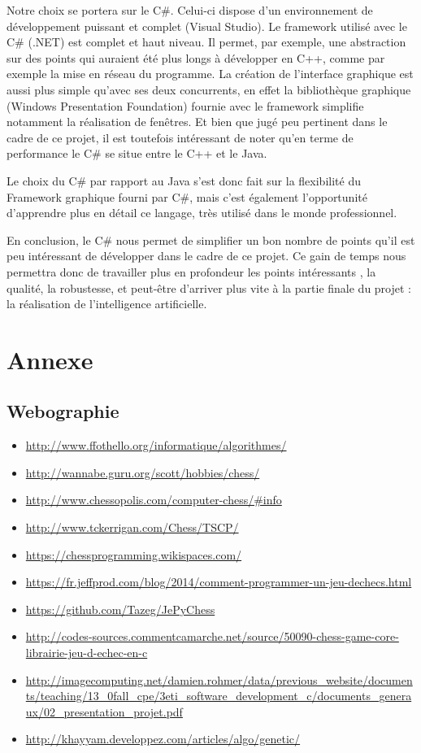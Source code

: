\documentclass{article}
\begin{document}
Notre choix se portera sur le C\#. Celui-ci dispose d'un environnement de développement puissant et complet (Visual Studio). Le framework utilisé avec le C\# (.NET) est complet et haut niveau. Il permet, par exemple, une abstraction sur des points qui auraient été plus longs à développer en C++, comme par exemple la mise en réseau du programme. La création de l'interface graphique est aussi plus simple qu'avec ses deux concurrents, en effet la bibliothèque graphique (Windows Presentation Foundation) fournie avec le framework simplifie notamment la réalisation de fenêtres. Et bien que jugé peu pertinent dans le cadre de ce projet, il est toutefois intéressant de noter qu'en terme de performance le C\# se situe entre le C++ et le Java.
\newline

Le choix du C\# par rapport au Java s'est donc fait sur la flexibilité du Framework graphique fourni par C\#, mais c'est également l'opportunité d'apprendre plus en détail ce langage, très utilisé dans le monde professionnel.
\newline

En conclusion, le C\# nous permet de simplifier un bon nombre de points qu'il est peu intéressant de développer dans le cadre de ce projet. Ce gain de temps nous permettra donc de travailler plus en profondeur les points intéressants , la qualité, la robustesse, et peut-être d'arriver plus vite à la partie finale du projet : la réalisation de l'intelligence artificielle.

\newpage
\section{Annexe}
\subsection{Webographie}
\begin{itemize}
 \item \url{http://www.ffothello.org/informatique/algorithmes/}
 \item \url{http://wannabe.guru.org/scott/hobbies/chess/}
 \item \url{http://www.chessopolis.com/computer-chess/#info}
 \item \url{http://www.tckerrigan.com/Chess/TSCP/}
 \item \url{https://chessprogramming.wikispaces.com/}
 \item \url{https://fr.jeffprod.com/blog/2014/comment-programmer-un-jeu-dechecs.html}
 \item \url{https://github.com/Tazeg/JePyChess}
 \item \url{http://codes-sources.commentcamarche.net/source/50090-chess-game-core-librairie-jeu-d-echec-en-c}
 \item \url{http://imagecomputing.net/damien.rohmer/data/previous_website/documents/teaching/13_0fall_cpe/3eti_software_development_c/documents_generaux/02_presentation_projet.pdf}
 \item \url{http://khayyam.developpez.com/articles/algo/genetic/}
\end{itemize}
\end{document}

